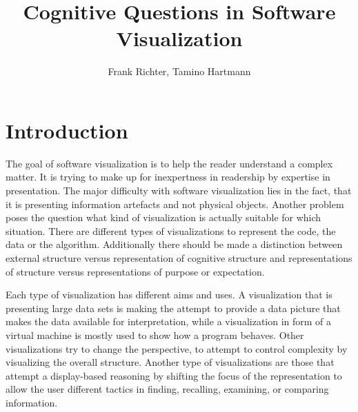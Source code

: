 \documentclass[11pt, a4paper, ngerman, twoside]{article}
\date{}
\theoremstyle{plain}\newtheorem{Lemma}{Lemma}
\theoremstyle{plain}\newtheorem{Satz}[Lemma]{Satz}
\theoremstyle{definition}\newtheorem{Definition}[Lemma]{Definition}
\theoremstyle{definition}\newtheorem*{Beispiel}{Beispiel}
\theoremstyle{remark}\newtheorem*{Bemerkung}{Bemerkung}
\begin{document}
\title{Cognitive Questions in Software Visualization}
\author{Frank Richter, Tamino Hartmann}

\makeatletter
\let\mytitle\@title
\let\myauthor\@author
\makeatother
\maketitle
\begin{abstract}



\end{abstract}

\section{Introduction}
The goal of software visualization is to help the reader understand a complex matter. It is trying to make up for inexpertness in readership by expertise in presentation. The major difficulty with software visualization lies in the fact, that it is presenting information artefacts and not physical objects. Another problem poses the question what kind of visualization is actually suitable for which situation.
There are different types of visualizations to represent the code, the data or the algorithm\cite{myers}. Additionally there should be made a distinction between external structure versus representation of cognitive structure and representations of structure versus representations of purpose or expectation\cite{origin}.

Each type of visualization has different aims and uses. A visualization that is presenting large data sets is making the attempt to provide a data picture that makes the data available for interpretation, while a visualization in form of a virtual machine is mostly used to show how a program behaves. Other visualizations try to change the perspective, to attempt to control complexity by visualizing the overall structure. Another type of visualizations are those that attempt a display-based reasoning by shifting the focus of the representation to allow the user different tactics in finding, recalling, examining, or comparing information\cite{davies1993}\cite{davies1996}.
\end{document}
